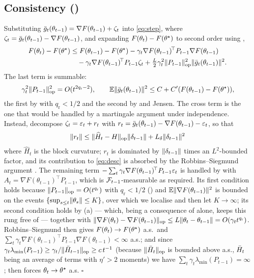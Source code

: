 \subsection{Consistency (\texorpdfstring{}{Theorem})}

Substituting $\bar{g}_t(\theta_{t-1})=\nabla F(\theta_{t-1})+\zeta_t$ into \eqref{eq:step},
where $\zeta_t=\bar{g}_t(\theta_{t-1})-\nabla F(\theta_{t-1})$, and expanding
$F(\theta_t)-F(\theta^\star)$ to second order using ,
\begin{align}
F(\theta_t)-F(\theta^\star)&\le F(\theta_{t-1})-F(\theta^\star)
-\gamma_t\nabla F(\theta_{t-1})^{\!\top}P_{t-1}\nabla F(\theta_{t-1})\nonumber\\
&\quad-\gamma_t\nabla F(\theta_{t-1})^{\!\top}P_{t-1}\zeta_t
+\tfrac{L}{2}\gamma_t^2\lVert P_{t-1} \rVert_{\mathrm{op}}^2\lVert \bar{g}_t(\theta_{t-1}) \rVert^2 .
\label{eq:desc}
\end{align}
The last term is summable:
\[
\gamma_t^2\lVert P_{t-1} \rVert_{\mathrm{op}}^2=O(t^{2q_{\mathrm r}-2}),
\qquad
\mathbb{E}\lVert \bar{g}_t(\theta_{t-1}) \rVert^2\le C+C'(F(\theta_{t-1})-F(\theta^\star)),
\]
the first by  with $q_{\mathrm r}<1/2$ and the second by  and
Jensen. The cross term is the one that
would be handled by a martingale argument under independence. Instead, decompose
$\zeta_t=\varepsilon_t+r_t$ with $r_t=\bar{g}_t(\theta_{t-1})-\nabla F(\theta_{t-1})-\varepsilon_t$, so that
\begin{equation}
\lVert r_t \rVert\le\lVert \widehat H_t-H \rVert_{\mathrm{op}}\lVert \delta_{t-1} \rVert+L_\delta\lVert \delta_{t-1} \rVert^2
\label{eq:rt}
\end{equation}
where $\widehat H_t$ is the block curvature; $r_t$ is dominated by
$\lVert \delta_{t-1} \rVert$ times an $L^2$-bounded factor, and its contribution to
\eqref{eq:desc} is absorbed by the Robbins--Siegmund argument
\citep{robbins1971convergence}. The remaining term
$-\sum_t\gamma_t\nabla F(\theta_{t-1})^{\!\top}P_{t-1}\varepsilon_t$ is handled by
 with $A_t=\nabla F(\theta_{t-1})^{\!\top}P_{t-1}$, which is
$\mathcal{F}_{t-1}$-measurable as required. Its first condition holds because
$\lVert P_{t-1} \rVert_{\mathrm{op}}=O(t^{q_{\mathrm r}})$ with $q_{\mathrm r}<1/2$ () and
$\mathbb{E}\lVert \nabla F(\theta_{t-1}) \rVert^2$ is bounded on the events
$\{\sup_{s\le t}\lVert \theta_s \rVert\le K\}$, over which we localise and then let $K\to\infty$;
its second condition holds by (a) --- which, being a consequence of
 alone, keeps this rung free of  --- together with
$\lVert \nabla F(\theta_t)-\nabla F(\theta_{t-1}) \rVert_{\mathrm{op}}\le L\lVert \theta_t-\theta_{t-1} \rVert
=O(\gamma_t t^{q_{\mathrm r}})$. Robbins--Siegmund then gives $F(\theta_t)\to F(\theta^\star)$ a.s.\ and
$\sum_t\gamma_t\nabla F(\theta_{t-1})^{\!\top}P_{t-1}\nabla F(\theta_{t-1})<\infty$ a.s.;
and since $\gamma_t\lambda_{\min}(P_{t-1})\ge \gamma_t/\lVert \bar{H}_{t-1} \rVert_{\mathrm{op}}\ge c\,t^{-1}$
(because $\lVert \bar{H}_t \rVert_{\mathrm{op}}$ is bounded above a.s., $\bar{H}_t$ being an average of terms with
$\eta'>2$ moments) we have $\sum_t\gamma_t\lambda_{\min}(P_{t-1})=\infty$; 
then forces $\theta_t\to\theta^\star$ a.s. \hfill$\square$

